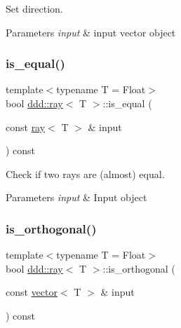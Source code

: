 Set direction. 


\begin{DoxyParams}{Parameters}
{\em input} & input vector object \\
\hline
\end{DoxyParams}
\mbox{\label{classddd_1_1ray_a9f556671f1aafce7838d9cd716e1bd72}} 
\subsubsection{\texorpdfstring{is\+\_\+equal()}{is\_equal()}}
{\footnotesize\ttfamily template$<$typename T = Float$>$ \\
bool \hyperlink{classddd_1_1ray}{ddd\+::ray}$<$ T $>$\+::is\+\_\+equal (\begin{DoxyParamCaption}\item[{const \hyperlink{classddd_1_1ray}{ray}$<$ T $>$ \&}]{input }\end{DoxyParamCaption}) const\hspace{0.3cm}{\ttfamily [inline]}}



Check if two rays are (almost) equal. 


\begin{DoxyParams}{Parameters}
{\em input} & Input object \\
\hline
\end{DoxyParams}
\mbox{\label{classddd_1_1ray_ad8713b370161724762d493309d6a6c97}} 
\subsubsection{\texorpdfstring{is\+\_\+orthogonal()}{is\_orthogonal()}\hspace{0.1cm}{\footnotesize\ttfamily [1/5]}}
{\footnotesize\ttfamily template$<$typename T = Float$>$ \\
bool \hyperlink{classddd_1_1ray}{ddd\+::ray}$<$ T $>$\+::is\+\_\+orthogonal (\begin{DoxyParamCaption}\item[{const \hyperlink{classddd_1_1vector}{vector}$<$ T $>$ \&}]{input }\end{DoxyParamCaption}) const\hspace{0.3cm}{\ttfamily [inline]}}



